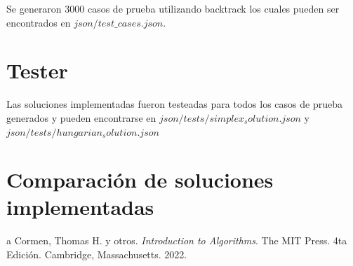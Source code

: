 \documentclass[10pt]{article} %
\begin{document}
	Se generaron 3000 casos de prueba utilizando backtrack los cuales pueden ser encontrados en $ json/test\_cases.json $.
	
	\section{Tester}
	 Las soluciones implementadas fueron testeadas para todos los casos de prueba generados y pueden encontrarse en $ json/tests/simplex_solution.json $ y $ json/tests/hungarian_solution.json $
	
	\section{Comparaci\'on de soluciones implementadas}
	
	\begin{thebibliography}
		a
		 Cormen, Thomas H. y otros. \emph{Introduction to Algorithms}. 
		The MIT Press.
		4ta Edici\'on.		
		Cambridge, Massachusetts.
		2022.
	\end{thebibliography}
\end{document}
